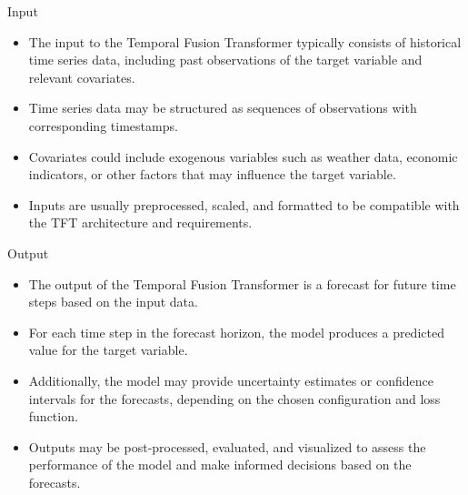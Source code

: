 \begin{frame}{Input}		
	
\begin{itemize}[label=--]
	\item The input to the Temporal Fusion Transformer typically consists of historical time series data, including past observations of the target variable and relevant covariates.
	\item Time series data may be structured as sequences of observations with corresponding timestamps.
	\item Covariates could include exogenous variables such as weather data, economic indicators, or other factors that may influence the target variable.
	\item Inputs are usually preprocessed, scaled, and formatted to be compatible with the TFT architecture and requirements.
\end{itemize}
\end{frame}

\begin{frame}{Output}			
	\begin{itemize}[label=--]
		\item The output of the Temporal Fusion Transformer is a forecast for future time steps based on the input data.
		\item For each time step in the forecast horizon, the model produces a predicted value for the target variable.
		\item Additionally, the model may provide uncertainty estimates or confidence intervals for the forecasts, depending on the chosen configuration and loss function.
		\item Outputs may be post-processed, evaluated, and visualized to assess the performance of the model and make informed decisions based on the forecasts.
	\end{itemize}
	
\end{frame}

